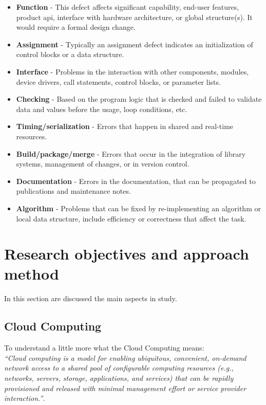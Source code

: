 \begin{itemize}
	\item \textbf{Function} - This defect affects significant capability, end-user features, product \acl{api}, interface with hardware architecture, or global structure(s). It would require a formal design change.
	\item \textbf{Assignment} - Typically an assignment defect indicates an initialization of control blocks or a data structure.
	\item \textbf{Interface} - Problems in the interaction with other components, modules, device drivers, call statements, control blocks, or parameter lists.
	\item \textbf{Checking} - Based on the program logic that is checked and failed to validate data and values before the usage, loop conditions, etc.
	\item \textbf{Timing/serialization} - Errors that happen in shared and real-time resources.
	\item \textbf{Build/package/merge} - Errors that occur in the integration of library systems, management of changes, or in version control.
	\item \textbf{Documentation} - Errors in the documentation, that can be propagated to publications and maintenance notes.
	\item \textbf{Algorithm} - Problems that can be fixed by re-implementing an algorithm or local data structure, include efficiency or correctness that affect the task.
\end{itemize}


\newpage
\section{Research objectives and approach method}

In this section are discussed the main aspects in study.

\subsection{Cloud Computing}



To understand a little more what the Cloud Computing means:\\

\textit{``Cloud computing is a model for enabling ubiquitous, convenient, on-demand network access to a shared pool of configurable computing resources (e.g., networks, servers, storage, applications, and services) that can be rapidly provisioned and released with minimal management effort or service provider interaction.''}\cite{mell2011nist}.\\

